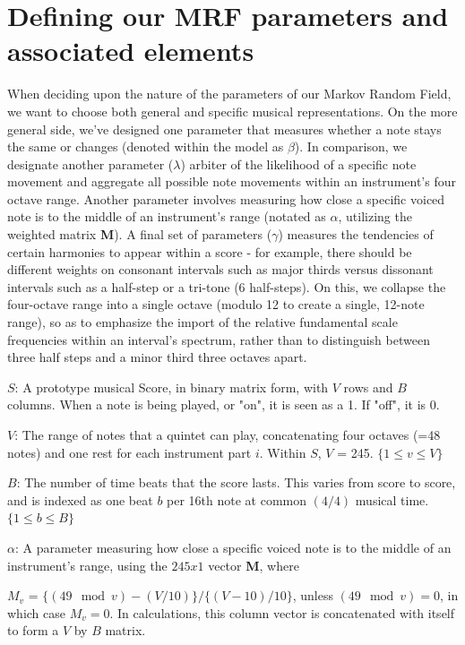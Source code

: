 \documentclass{article}
\begin{document}
\section{Defining our MRF parameters and associated elements}

When deciding upon the nature of the parameters of our Markov Random Field, we want to choose both general and specific musical representations.  On the more general side, we've designed one parameter that measures whether a note stays the same or changes (denoted within the model as $\beta$).  In comparison, we designate another parameter ($\lambda$) arbiter of the likelihood of a specific note movement and aggregate all possible note movements within an instrument's four octave range.  Another parameter involves measuring how close a specific voiced note is to the middle of an instrument's range (notated as $\alpha$, utilizing the weighted matrix {\bf M}).  A final set of parameters ($\gamma$) measures the tendencies of certain harmonies to appear within a score - for example, there should be different weights on consonant intervals such as major thirds versus dissonant intervals such as a half-step or a tri-tone (6 half-steps).  On this, we collapse the four-octave range into a single octave (modulo 12 to create a single, 12-note range), so as to emphasize the import of the relative fundamental scale frequencies within an interval's spectrum, rather than to distinguish between three half steps and a minor third three octaves apart.

$S$: A prototype musical Score, in binary matrix form, with $V$ rows and $B$ columns.  When a note is being played, or "on", it is seen as a 1.  If "off", it is 0.

$V$: The range of notes that a quintet can play, concatenating four octaves (=48 notes) and one rest for each instrument part $i$.  Within $S$, $V$ = 245.  $\{1 \le v \le V\}$

$B$: The number of time beats that the score lasts.  This varies from score to score, and is indexed as one beat $b$ per 16th note at common $(4/4)$ musical time.  $\{1 \le b \le B\}$

$\alpha$: A parameter measuring how close a specific voiced note is to the middle of an instrument's range, using the $245x1$ vector {\bf M}, where

$M_v$ = $\{(49\mod{v}) - (V/10)\} / \{(V-10)/10\}$, unless $(49\mod{v}) = 0$, in which case $M_v = 0$.  In calculations, this column vector is concatenated with itself to form a $V$ by $B$ matrix.
\end{document}
